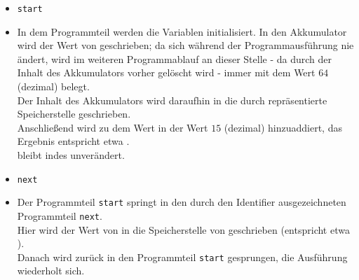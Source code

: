 \noindent
\begin{itemize}
\itemsep0.5em
\item \texttt{start}
\item[] In dem Programmteil werden die Variablen initialisiert.
In den Akkumulator  wird der Wert von  geschrieben; da sich  während der Programmausführung nie ändert, wird  im weiteren Programmablauf an dieser Stelle - da durch  der Inhalt des Akkumulators vorher gelöscht wird - immer mit dem Wert $64$ (dezimal) belegt.\\
Der Inhalt des Akkumulators wird daraufhin in die durch  repräsentierte Speicherstelle geschrieben.\\
Anschließend wird zu dem Wert in  der Wert $15$ (dezimal) hinzuaddiert, das Ergebnis entspricht etwa .\\
 bleibt indes unverändert.

\item \texttt{next}
\item[] Der Programmteil \texttt{start} springt in den durch den Identifier ausgezeichneten Programmteil \texttt{next}.\\
Hier wird der Wert von  in die Speicherstelle von  geschrieben (entspricht etwa ).\\
Danach wird zurück in den Programmteil \texttt{start} gesprungen, die Ausführung wiederholt sich.
\end{itemize}
